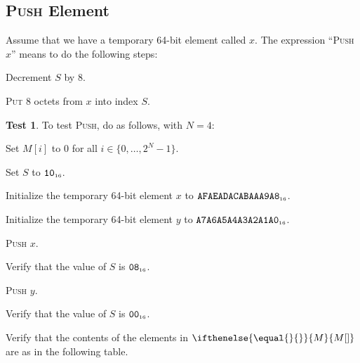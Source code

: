 \documentclass[a4paper,12pt]{article}
\newcommand{\num}[1]{\texttt{#1}}
\newcommand{\hex}[1]{\num{#1}_{\textup{\tiny 16}}}
\newcommand{\MEM}[1]{\ifthenelse{\equal{#1}{}}{M}{M[#1]}}
\newcommand{\SP}{S}
\newcommand{\range}[2]{\{#1,\ldots,#2\}}
\newcommand{\proc}[1]{\textsc{#1}}
\theoremstyle{definition}
\newtheorem{test}{Test}
\begin{document}
\subsection{\proc{Push} Element}

Assume that we have a temporary 64-bit element called $x$.
The expression ``\proc{Push} $x$'' means to do the following steps:
\begin{stepnumbers}
\item Decrement $\SP$ by 8.
\item \proc{Put} 8 octets from $x$ into index $\SP$.
\end{stepnumbers}

\begin{test}
  To test \proc{Push}, do as follows, with $N=4$:
  \begin{stepnumbers}
  \item Set $M[i]$ to 0 for all $i \in \range{0}{2^N-1}$.
  \item Set $\SP$ to $\hex{10}$.
  \item Initialize the temporary 64-bit element $x$ to $\hex{AFAEADACABAAA9A8}$.
  \item Initialize the temporary 64-bit element $y$ to $\hex{A7A6A5A4A3A2A1A0}$.
  \item \proc{Push} $x$.
  \item Verify that the value of $\SP$ is $\hex{08}$.
  \item \proc{Push} $y$.
  \item Verify that the value of $\SP$ is $\hex{00}$.
  \item Verify that the contents of the elements in $\MEM{}$ are as in the following table.
  \end{stepnumbers}


\end{test}
\end{document}
